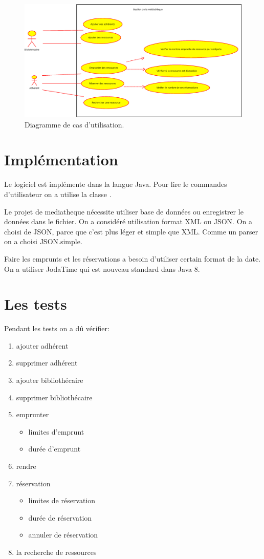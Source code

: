 \documentclass[10pt, a4paper]{article}
\begin{document}
    		 \begin{figure}[h]
			\begin{center}
				\includegraphics[width=1\textwidth]{graphics/usecasediagram.eps}
				\caption{Diagramme de cas d'utilisation.}
			\end{center}
		\end{figure}
	
	\section{Implémentation}
	Le logiciel est implémente dans la langue Java. Pour lire le commandes d'utilisateur on a utilise 
	la classe .
	
	Le projet de mediatheque nécessite utiliser base de données ou enregistrer le données dans le fichier.
	On a considéré utilisation format XML ou JSON. On a choisi de JSON, parce que c'est plus léger et 
	simple que XML. Comme un parser on a choisi JSON.simple.
	
	Faire les emprunts et les réservations a besoin d'utiliser certain format de la date. On a utiliser 
	JodaTime qui est nouveau standard dans Java 8.
	
	\section{Les tests}
	Pendant les tests on a dû vérifier:
	\begin{enumerate}
		\item ajouter adhérent
		\item supprimer adhérent
		\item ajouter bibliothécaire
		\item supprimer bibliothécaire
		\item emprunter
		\begin{itemize}
			\item limites d'emprunt
			\item durée d'emprunt
		\end{itemize}
		\item rendre
		\item réservation
		\begin{itemize}
			\item limites de réservation
			\item durée de réservation
			\item annuler de réservation
		\end{itemize}
		\item la recherche de ressources 
	\end{enumerate}
	
\end{document}
